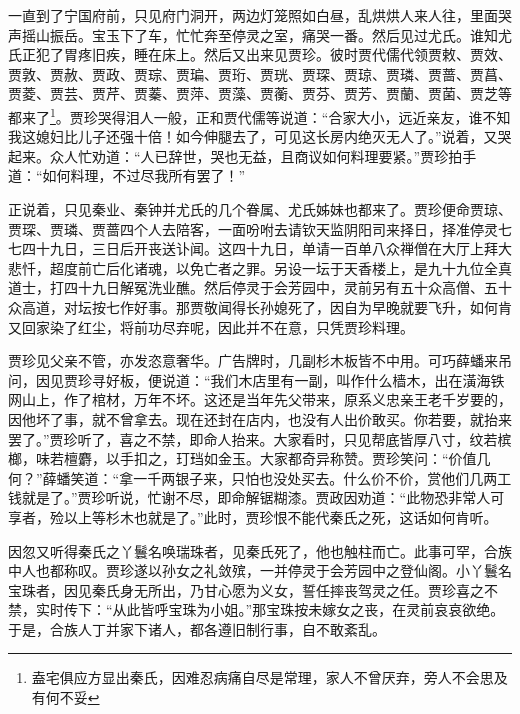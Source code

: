 \documentclass[12pt,oneside]{book}
\begin{document}
一直到了宁国府前，只见府门洞开，两边灯笼照如白昼，乱烘烘人来人往，里面哭声摇山振岳。宝玉下了车，忙忙奔至停灵之室，痛哭一番。然后见过尤氏。谁知尤氏正犯了胃疼旧疾，睡在床上。然后又出来见贾珍。彼时贾代儒代领贾敕、贾效、贾敦、贾赦、贾政、贾琮、贾㻞、贾珩、贾珖、贾琛、贾琼、贾璘、贾蔷、贾菖、贾菱、贾芸、贾芹、贾蓁、贾萍、贾藻、贾蘅、贾芬、贾芳、贾蘭、贾菌、贾芝等都来了\footnote{盍宅俱应方显出秦氏，因难忍病痛自尽是常理，家人不曾厌弃，旁人不会思及有何不妥}。贾珍哭得泪人一般，正和贾代儒等说道：“合家大小，远近亲友，谁不知我这媳妇比儿子还强十倍！如今伸腿去了，可见这长房内绝灭无人了。”说着，又哭起来。众人忙劝道：“人已辞世，哭也无益，且商议如何料理要紧。”贾珍拍手道：“如何料理，不过尽我所有罢了！”

正说着，只见秦业、秦钟并尤氏的几个眷属、尤氏姊妹也都来了。贾珍便命贾琼、贾琛、贾璘、贾蔷四个人去陪客，一面吩咐去请钦天监阴阳司来择日，择准停灵七七四十九日，三日后开丧送讣闻。这四十九日，单请一百单八众禅僧在大厅上拜大悲忏，超度前亡后化诸魂，以免亡者之罪。另设一坛于天香楼上，是九十九位全真道士，打四十九日解冤洗业醮。然后停灵于会芳园中，灵前另有五十众高僧、五十众高道，对坛按七作好事。那贾敬闻得长孙媳死了，因自为早晚就要飞升，如何肯又回家染了红尘，将前功尽弃呢，因此并不在意，只凭贾珍料理。

贾珍见父亲不管，亦发恣意奢华。广告牌时，几副杉木板皆不中用。可巧薛蟠来吊问，因见贾珍寻好板，便说道：“我们木店里有一副，叫作什么樯木，出在潢海铁网山上，作了棺材，万年不坏。这还是当年先父带来，原系义忠亲王老千岁要的，因他坏了事，就不曾拿去。现在还封在店内，也没有人出价敢买。你若要，就抬来罢了。”贾珍听了，喜之不禁，即命人抬来。大家看时，只见帮底皆厚八寸，纹若槟榔，味若檀麝，以手扣之，玎珰如金玉。大家都奇异称赞。贾珍笑问：“价值几何？”薛蟠笑道：“拿一千两银子来，只怕也没处买去。什么价不价，赏他们几两工钱就是了。”贾珍听说，忙谢不尽，即命解锯糊漆。贾政因劝道：“此物恐非常人可享者，殓以上等杉木也就是了。”此时，贾珍恨不能代秦氏之死，这话如何肯听。

因忽又听得秦氏之丫鬟名唤瑞珠者，见秦氏死了，他也触柱而亡。此事可罕，合族中人也都称叹。贾珍遂以孙女之礼敛殡，一并停灵于会芳园中之登仙阁。小丫鬟名宝珠者，因见秦氏身无所出，乃甘心愿为义女，誓任摔丧驾灵之任。贾珍喜之不禁，实时传下：“从此皆呼宝珠为小姐。”那宝珠按未嫁女之丧，在灵前哀哀欲绝。于是，合族人丁并家下诸人，都各遵旧制行事，自不敢紊乱。
\end{document}
